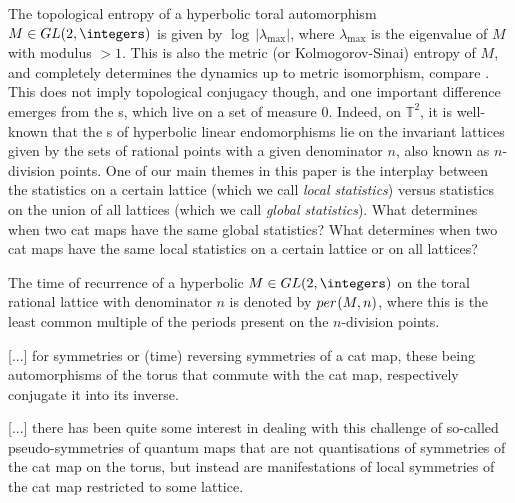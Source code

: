 {The topological entropy of a hyperbolic toral automorphism $M\in GL
(2,\integers)$ is given by $\log\,\lvert \lambda_{\mathrm{max}}\rvert$,
where $\lambda_{\mathrm{max}}$ is the eigenvalue of $M$ with modulus
$>1$.  This is also the metric (or Kolmogorov-Sinai) entropy of $M$,
and completely determines the dynamics up to metric isomorphism,
compare .  This does not imply topological conjugacy though,
and one important difference emerges from the {\po}s, which
live on a set of measure $0$. Indeed, on $\mathbb{T}^2$, it is well-known
that the {\po}s of hyperbolic linear endomorphisms lie on the
invariant lattices given by the sets of rational points with a given
denominator $n$, also known as $n$-division points.  One of our main themes in
this paper is the interplay between the {\po} statistics on a
certain lattice (which we call \emph{local statistics}) versus
{\po} statistics on the union of all lattices (which we call
\emph{global statistics}). What determines when two cat maps have the
same global statistics? What determines when two cat maps have the
same local statistics on a certain lattice or on all lattices?

The time of recurrence of a hyperbolic $M \in GL (2,\integers)$ on
the toral rational lattice with denominator $n$ is denoted by ${per}{\hspace{0.5pt}}
(M,n)$, where this is the least common multiple of the periods present
on the $n$-division points.

[...] for symmetries or (time)
reversing symmetries of a cat map, these being automorphisms of the
torus that commute with the cat map, respectively conjugate it into
its inverse.

[...] there has been quite some
interest in dealing with this challenge of so-called pseudo-symmetries
of quantum maps that are not quantisations of symmetries of the cat
map on the torus, but instead are manifestations of local symmetries
of the cat map restricted to some lattice. %

}

